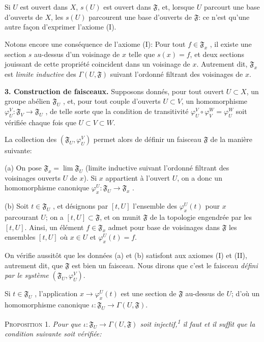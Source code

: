 Si $U$ est ouvert dans $X$, $s(U)$ est ouvert dans $\mathfrak{F}$, et, lorsque $U$ parcourt une
base d'ouverts de $X$, les $s(U)$ parcourent une base d'ouverts de $\mathfrak{F}$: ce n'est qu'une autre façon d'exprimer l'axiome (I).

Notons encore une conséquence de l'axiome (I): Pour tout $f \in \mathfrak{F}_x$ , il existe une section $s$ au-dessus d'un voisinage de $x$ telle que $s(x) = f$, et deux sections jouissant de cette propriété coincident dans un voisinage de $x$. Autrement dit, $\mathfrak{F}_x$ est \textit{limite inductive} des $\Gamma(U, \mathfrak{F})$ suivant l'ordonné filtrant des voisinages de $x$.

\textbf{3. Construction de faisceaux.} Supposons donnés, pour tout ouvert $U \subset X$, un groupe abélien $\mathfrak{F}_U$ , et, pour tout couple d'ouverts $U \subset V$, un homomorphisme $\varphi_U^V: \mathfrak{F}_V \to \mathfrak{F}_U$ , de telle sorte que la condition de transitivité $\varphi_U^V \circ \varphi_V^W = \varphi_U^W$ soit vérifiée chaque fois que $U \subset V \subset W$.

La collection des $(\mathfrak{F}_U , \varphi_U^V)$ permet alors de définir un faisceau $\mathfrak{F}$ de la manière suivante:

(a) On pose $\mathfrak{F}_x = \lim \mathfrak{F}_U$ (limite inductive suivant l'ordonné filtrant des voisinages ouverts $U$ de $x$). Si $x$ appartient à l'ouvert $U$, on a donc un homomorphisme canonique $\varphi_x^U: \mathfrak{F}_U \to \mathfrak{F}_x$ .

(b) Soit $t \in \mathfrak{F}_U$ , et désignons par $[t, U]$ l'ensemble des $\varphi_x^U(t)$ pour $x$ parcourant $U$; on a $[t, U] \subset \mathfrak{F}$, et on munit $\mathfrak{F}$ de la topologie engendrée par les $[t, U]$. Ainsi, un élément $f \in \mathfrak{F}_x$ admet pour base de voisinages dans $\mathfrak{F}$ les ensembles $[t, U]$ où $x \in U$ et $\varphi_x^U(t) = f$.

On vérifie aussitôt que les données (a) et (b) satisfont aux axiomes (I) et (II), autrement dit, que $\mathfrak{F}$ est bien un faisceau. Nous dirons que c'est le faisceau \textit{défini par le système} $(\mathfrak{F}_U , \varphi_U^V)$.

Si $t \in \mathfrak{F}_U$ , l'application $x \to \varphi_x^U(t)$ est une section de $\mathfrak{F}$ au-dessus de $U$; d'où un homomorphisme canonique $\iota: \mathfrak{F}_U \to \Gamma(U, \mathfrak{F})$.

\textsc{Proposition} 1. \textit{Pour que $\iota: \mathfrak{F}_U \to \Gamma(U, \mathfrak{F})$ soit injectif,\textsuperscript{1} il faut et il suffit que la condition suivante soit vérifiée:}

